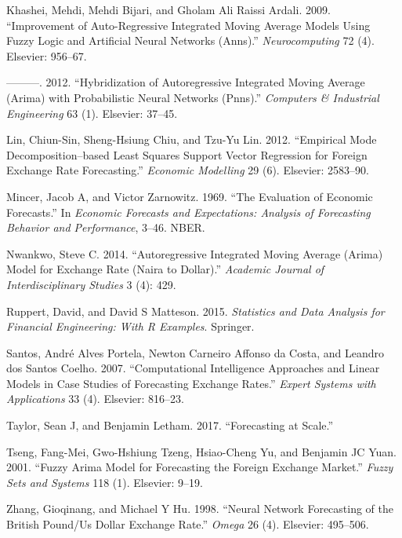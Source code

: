 \documentclass[12pt,preprint, authoryear]{elsarticle}
\numberwithin{equation}{section}
\numberwithin{figure}{section}
\numberwithin{table}{section}
\begin{document}
\hypertarget{ref-khashei2009}{}
Khashei, Mehdi, Mehdi Bijari, and Gholam Ali Raissi Ardali. 2009.
``Improvement of Auto-Regressive Integrated Moving Average Models Using
Fuzzy Logic and Artificial Neural Networks (Anns).''
\emph{Neurocomputing} 72 (4). Elsevier: 956--67.

\hypertarget{ref-khashei2012}{}
---------. 2012. ``Hybridization of Autoregressive Integrated Moving
Average (Arima) with Probabilistic Neural Networks (Pnns).''
\emph{Computers \& Industrial Engineering} 63 (1). Elsevier: 37--45.

\hypertarget{ref-lin2012}{}
Lin, Chiun-Sin, Sheng-Hsiung Chiu, and Tzu-Yu Lin. 2012. ``Empirical
Mode Decomposition--based Least Squares Support Vector Regression for
Foreign Exchange Rate Forecasting.'' \emph{Economic Modelling} 29 (6).
Elsevier: 2583--90.

\hypertarget{ref-mincer1969}{}
Mincer, Jacob A, and Victor Zarnowitz. 1969. ``The Evaluation of
Economic Forecasts.'' In \emph{Economic Forecasts and Expectations:
Analysis of Forecasting Behavior and Performance}, 3--46. NBER.

\hypertarget{ref-nwankwo2014}{}
Nwankwo, Steve C. 2014. ``Autoregressive Integrated Moving Average
(Arima) Model for Exchange Rate (Naira to Dollar).'' \emph{Academic
Journal of Interdisciplinary Studies} 3 (4): 429.

\hypertarget{ref-ruppert2015}{}
Ruppert, David, and David S Matteson. 2015. \emph{Statistics and Data
Analysis for Financial Engineering: With R Examples}. Springer.

\hypertarget{ref-santos2007}{}
Santos, André Alves Portela, Newton Carneiro Affonso da Costa, and
Leandro dos Santos Coelho. 2007. ``Computational Intelligence Approaches
and Linear Models in Case Studies of Forecasting Exchange Rates.''
\emph{Expert Systems with Applications} 33 (4). Elsevier: 816--23.

\hypertarget{ref-taylor2017}{}
Taylor, Sean J, and Benjamin Letham. 2017. ``Forecasting at Scale.''

\hypertarget{ref-tseng2001}{}
Tseng, Fang-Mei, Gwo-Hshiung Tzeng, Hsiao-Cheng Yu, and Benjamin JC
Yuan. 2001. ``Fuzzy Arima Model for Forecasting the Foreign Exchange
Market.'' \emph{Fuzzy Sets and Systems} 118 (1). Elsevier: 9--19.

\hypertarget{ref-zhang1998}{}
Zhang, Gioqinang, and Michael Y Hu. 1998. ``Neural Network Forecasting
of the British Pound/Us Dollar Exchange Rate.'' \emph{Omega} 26 (4).
Elsevier: 495--506.

\newpage
\nocite{*}

\end{document}
